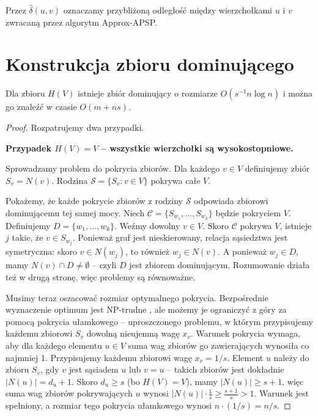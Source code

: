 \begin{definicja}
Przez $\hat{\delta}(u, v)$ oznaczamy przybliżoną odległość między wierzchołkami $u$ i $v$ zwracaną przez algorytm Approx-APSP.
\end{definicja}


\section{Konstrukcja zbioru dominującego}

\begin{twierdzenie}
Dla zbioru $H(V)$ istnieje zbiór dominujący o rozmiarze $O(s^{-1} n \log n)$ i można go znaleźć w czasie $O(m + ns)$.
\end{twierdzenie}

\begin{proof}
Rozpatrujemy dwa przypadki.

\textbf{Przypadek $H(V) = V$ -- wszystkie wierzchołki są wysokostopniowe.}

Sprowadzamy problem do pokrycia zbiorów. Dla każdego $v \in V$ definiujemy zbiór $S_v = N(v)$. Rodzina $\mathcal{S} = \{S_v \colon v \in V\}$ pokrywa całe $V$.

Pokażemy, że każde pokrycie zbiorów z rodziny $\mathcal{S}$ odpowiada zbiorowi dominującemu tej samej mocy. Niech $\mathcal{C} = \{S_{w_1}, \ldots, S_{w_k}\}$ będzie pokryciem $V$. Definiujemy $D = \{w_1, \ldots, w_k\}$. Weźmy dowolny $v \in V$. Skoro $\mathcal{C}$ pokrywa $V$, istnieje $j$ takie, że $v \in S_{w_j}$. Ponieważ graf jest nieskierowany, relacja sąsiedztwa jest symetryczna: skoro $v \in N(w_j)$, to również $w_j \in N(v)$. A ponieważ $w_j \in D$, mamy $N(v) \cap D \neq \emptyset$ -- czyli $D$ jest zbiorem dominującym. Rozumowanie działa też w drugą stronę, więc problemy są równoważne.

Musimy teraz oszacować rozmiar optymalnego pokrycia. Bezpośrednie wyznaczenie optimum jest NP-trudne \cite{Karp1972}, ale możemy je ograniczyć z góry za pomocą pokrycia ułamkowego -- uproszczonego problemu, w którym przypisujemy każdemu zbiorowi $S_v$ dowolną nieujemną wagę $x_v$. Warunek pokrycia wymaga, aby dla każdego elementu $u \in V$ suma wag zbiorów go zawierających wynosiła co najmniej 1. Przypisujemy każdemu zbiorowi wagę $x_v = 1/s$. Element $u$ należy do zbioru $S_v$, gdy $v$ jest sąsiadem $u$ lub $v = u$ -- takich zbiorów jest dokładnie $|N(u)| = d_u + 1$. Skoro $d_u \geq s$ (bo $H(V) = V$), mamy $|N(u)| \geq s + 1$, więc suma wag zbiorów pokrywających $u$ wynosi $|N(u)| \cdot \frac{1}{s} \geq \frac{s+1}{s} > 1$. Warunek jest spełniony, a rozmiar tego pokrycia ułamkowego wynosi $n \cdot (1/s) = n/s$.


\end{proof}
